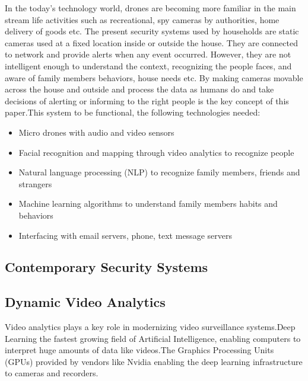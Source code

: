 \documentclass[sigconf]{acmart}
\begin{document}
In the today's technology world, drones are becoming more familiar in the main stream life activities such as recreational, spy cameras by authorities, home delivery of goods etc.
The present security systems used by households are static cameras used at a fixed location inside or outside the house. They are connected to network and provide alerts when any event occurred. However, they are not intelligent enough to understand the context, recognizing the people faces, and aware of family members behaviors, house needs etc.  By making cameras movable across the house and outside and process the data as humans do and take decisions of alerting or informing to the right people is the key concept of this paper.This system to be functional, the following technologies needed:

\begin{itemize}
  
\item Micro drones with audio and video sensors\cite{Labs2016}

\item Facial recognition and mapping through video analytics to recognize people
	
\item Natural language processing (NLP) to recognize family members, friends and strangers

\item Machine learning algorithms to understand family members habits and behaviors

\item Interfacing with email servers, phone, text message servers

\end{itemize}

\subsection{Contemporary Security Systems}

\subsection{Dynamic Video Analytics}

Video analytics plays a key role in modernizing video surveillance systems.Deep Learning the fastest growing field of Artificial Intelligence, enabling computers to interpret huge 
amounts of data like videos.The Graphics Processing Units (GPUs) provided 
by vendors like Nvidia enabling the deep learning infrastructure to cameras and recorders. 
\end{document}
